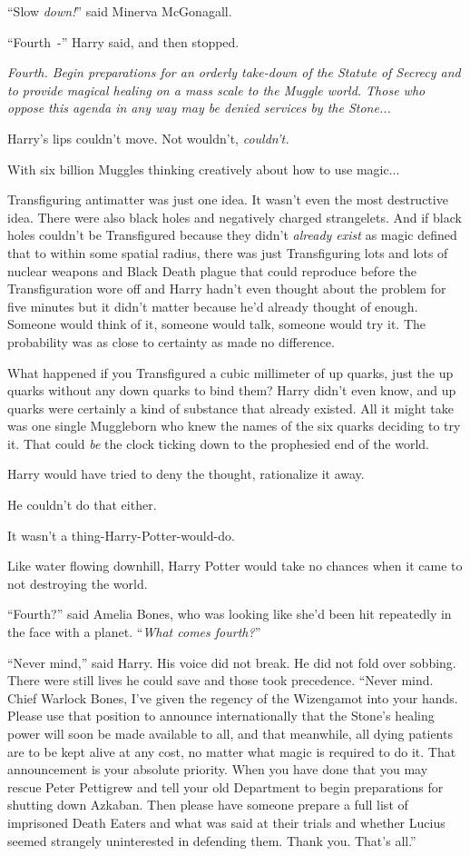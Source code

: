 ``Slow \emph{down!}'' said Minerva McGonagall.

``Fourth~-'' Harry said, and then stopped.

\emph{Fourth. Begin preparations for an orderly take-down of the Statute of Secrecy and to provide magical healing on a mass scale to the Muggle world. Those who oppose this agenda in any way may be denied services by the Stone...}

Harry's lips couldn't move. Not wouldn't, \emph{couldn't.}

With six billion Muggles thinking creatively about how to use magic...

Transfiguring antimatter was just one idea. It wasn't even the most destructive idea. There were also black holes and negatively charged strangelets. And if black holes couldn't be Transfigured because they didn't \emph{already exist} as magic defined that to within some spatial radius, there was just Transfiguring lots and lots of nuclear weapons and Black Death plague that could reproduce before the Transfiguration wore off and Harry hadn't even thought about the problem for five minutes but it didn't matter because he'd already thought of enough. Someone would think of it, someone would talk, someone would try it. The probability was as close to certainty as made no difference.

What happened if you Transfigured a cubic millimeter of up quarks, just the up quarks without any down quarks to bind them? Harry didn't even know, and up quarks were certainly a kind of substance that already existed. All it might take was one single Muggleborn who knew the names of the six quarks deciding to try it. That could \emph{be} the clock ticking down to the prophesied end of the world.

Harry would have tried to deny the thought, rationalize it away.

He couldn't do that either.

It wasn't a thing-Harry-Potter-would-do.

Like water flowing downhill, Harry Potter would take no chances when it came to not destroying the world.

``Fourth?'' said Amelia Bones, who was looking like she'd been hit repeatedly in the face with a planet. ``\emph{What comes fourth?}''

``Never mind,'' said Harry. His voice did not break. He did not fold over sobbing. There were still lives he could save and those took precedence. ``Never mind. Chief Warlock Bones, I've given the regency of the Wizengamot into your hands. Please use that position to announce internationally that the Stone's healing power will soon be made available to all, and that meanwhile, all dying patients are to be kept alive at any cost, no matter what magic is required to do it. That announcement is your absolute priority. When you have done that you may rescue Peter Pettigrew and tell your old Department to begin preparations for shutting down Azkaban. Then please have someone prepare a full list of imprisoned Death Eaters and what was said at their trials and whether Lucius seemed strangely uninterested in defending them. Thank you. That's all.''

